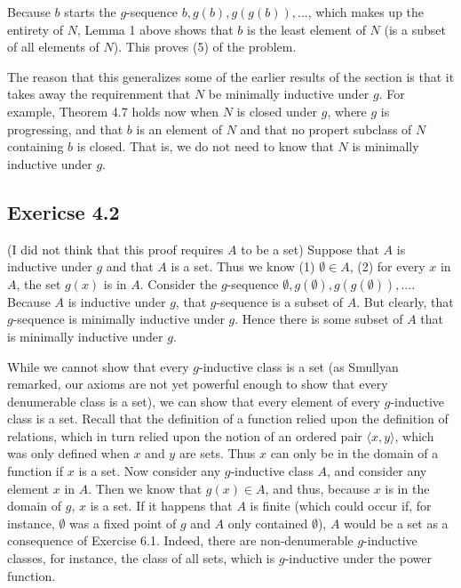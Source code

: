\documentclass{article}
\theoremstyle{definition}
\begin{document}
Because $b$ starts the $g$-sequence $b,g(b),g(g(b)),...$, which makes up the entirety of $N$, Lemma 1 
above shows that $b$ is the least element of 
$N$ (is a subset of all elements of $N$). This proves (5) of the problem.


The reason that this generalizes some of the earlier results of the section is that it takes away the requirenment that $N$ be minimally inductive under $g$. For example, 
Theorem 4.7 holds now when $N$ is closed under $g$, where $g$ is progressing, 
and that $b$ is an element of $N$ and that no propert subclass of $N$ containing $b$ is closed. That 
is, we do not need to know that $N$ is minimally inductive under $g$. 

\subsection*{Exericse 4.2}
(I did not think that this proof requires $A$ to be a set)\newline
Suppose that $A$ is inductive under $g$ and that $A$ is a set. Thus we know\newline
(1) $\emptyset\in A$,\newline
(2) for every $x$ in $A$, the set $g(x)$ is in $A$.\newline
Consider the $g$-sequence $\emptyset,g(\emptyset),g(g(\emptyset)),...$. Because $A$ is inductive under $g$, that $g$-sequence is a subset of 
$A$. But clearly, that $g$-sequence is minimally inductive under $g$. Hence there is some subset of $A$ that is minimally inductive under $g$.


While we cannot show that every $g$-inductive class is a set (as Smullyan remarked, our axioms are not yet powerful enough to show that every denumerable class 
is a set), we can show that every element of every $g$-inductive class is a set. Recall that the definition of a function relied upon the definition of relations, which 
in turn relied upon the notion of an ordered pair $\langle x,y\rangle$, which was only defined when $x$ and $y$ are sets. Thus $x$ can only be in the domain of a function if 
$x$ is a set. Now consider any $g$-inductive class $A$, and 
consider any element $x$ in $A$. Then we know that $g(x)\in A$, and thus, because $x$ is in the domain of $g$, $x$ is a set. If it happens that $A$ is finite (which could 
occur if, for instance, $\emptyset$ was a fixed point of $g$ and $A$ only contained $\emptyset$), $A$ would be a set as a consequence of Exercise 6.1. Indeed, there are non-denumerable 
$g$-inductive classes, for instance, the class of all sets, which is $g$-inductive under the power function.
\end{document}
